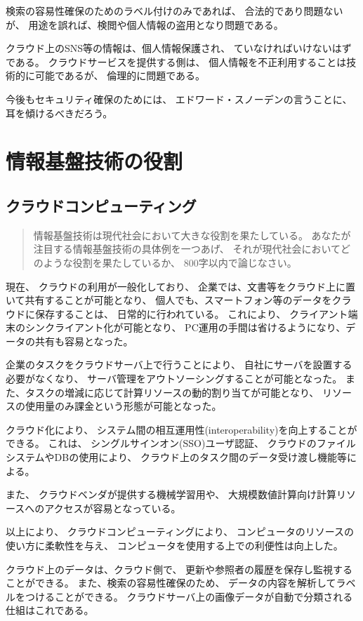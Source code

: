 \documentclass[12pt]{jsarticle}
\begin{document}
検索の容易性確保のためのラベル付けのみであれば、
合法的であり問題ないが、
用途を誤れば、検閲や個人情報の盗用となり問題である。

クラウド上のSNS等の情報は、個人情報保護され、
ていなければいけないはずである。
クラウドサービスを提供する側は、
個人情報を不正利用することは技術的に可能であるが、
倫理的に問題である。

今後もセキュリティ確保のためには、
エドワード・スノーデンの言うことに、
耳を傾けるべきだろう。


\section{
情報基盤技術の役割
}

\subsection{
クラウドコンピューティング
}

\begin{quotation}
情報基盤技術は現代社会において大きな役割を果たしている。
あなたが注目する情報基盤技術の具体例を一つあげ、
それが現代社会においてどのような役割を果たしているか、
800字以内で論じなさい。
\end{quotation}

現在、
クラウドの利用が一般化しており、
企業では、文書等をクラウド上に置いて共有することが可能となり、
個人でも、スマートフォン等のデータをクラウドに保存することは、
日常的に行われている。
これにより、
クライアント端末のシンクライアント化が可能となり、
PC運用の手間は省けるようになり、データの共有も容易となった。

企業のタスクをクラウドサーバ上で行うことにより、
自社にサーバを設置する必要がなくなり、
サーバ管理をアウトソーシングすることが可能となった。
また、タスクの増減に応じて計算リソースの動的割り当てが可能となり、
リソースの使用量のみ課金という形態が可能となった。

クラウド化により、
システム間の相互運用性(interoperability)を向上することができる。
これは、
シングルサインオン(SSO)ユーザ認証、
クラウドのファイルシステムやDBの使用により、
クラウド上のタスク間のデータ受け渡し機能等による。

また、
クラウドベンダが提供する機械学習用や、
大規模数値計算向け計算リソースへのアクセスが容易となっている。

以上により、
クラウドコンピューティングにより、
コンピュータのリソースの使い方に柔軟性を与え、
コンピュータを使用する上での利便性は向上した。

クラウド上のデータは、クラウド側で、
更新や参照者の履歴を保存し監視することができる。
また、検索の容易性確保のため、
データの内容を解析してラベルをつけることができる。
クラウドサーバ上の画像データが自動で分類される仕組はこれである。
\end{document}
